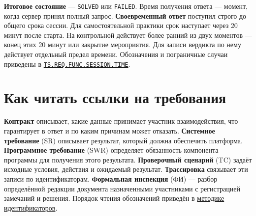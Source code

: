 \documentclass[12pt,a4paper]{article}
\begin{document}
\textbf{Итоговое состояние} --- \texttt{SOLVED} или \texttt{FAILED}. Время получения ответа --- момент, когда сервер принял полный запрос. \textbf{Своевременный ответ} поступил строго до общего срока сессии. Для самостоятельной практики срок наступает через 20 минут после старта. На контрольной действует более ранний из двух моментов --- конец этих 20 минут или закрытие мероприятия. Для записи вердикта по нему действует отдельный предел времени. Обозначения и пограничные случаи приведены в {\href{../02\_Техническое\_задание/DOC-02\_Техническое\_задание.pdf\#ts-req-func-session-time}{\texttt{TS.\allowbreak{}REQ.\allowbreak{}FUNC.\allowbreak{}SESSION.\allowbreak{}TIME}}}.

\section{Как читать ссылки на требования}\label{ux43aux430ux43a-ux447ux438ux442ux430ux442ux44c-ux441ux441ux44bux43bux43aux438-ux43dux430-ux442ux440ux435ux431ux43eux432ux430ux43dux438ux44f}

\hypertarget{как-читать-ссылки-на-требования}{}

\textbf{Контракт} описывает, какие данные принимает участник взаимодействия, что гарантирует в ответ и по каким причинам может отказать. \textbf{Системное требование} (SR) описывает результат, который должна обеспечить платформа. \textbf{Программное требование} (SWR) определяет обязанность компонента программы для получения этого результата. \textbf{Проверочный сценарий} (TC) задаёт исходные условия, действия и ожидаемый результат. \textbf{Трассировка} связывает эти записи по идентификаторам. \textbf{Формальная инспекция} (ФИ) --- разбор определённой редакции документа назначенными участниками с регистрацией замечаний и решения. Порядок чтения обозначений приведён в {\href{Методика\_идентификаторов.pdf\#форматы}{методике идентификаторов}}.
\end{document}
